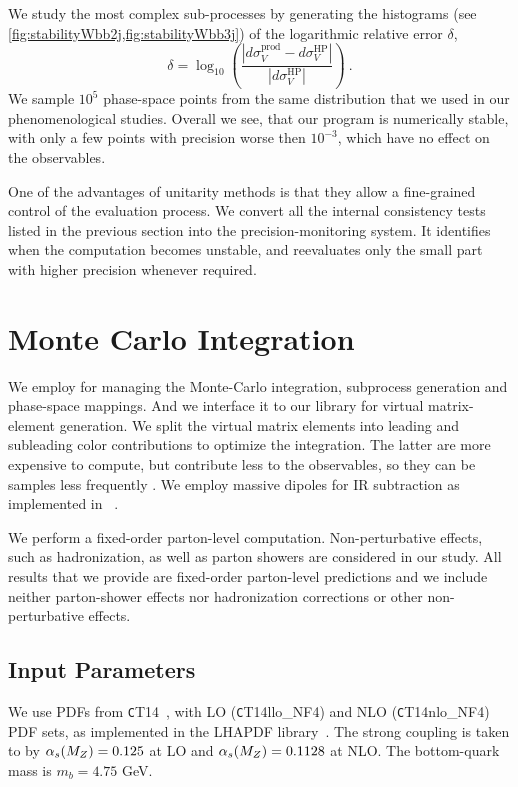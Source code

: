 We study the most complex sub-processes
by generating the histograms (see \cref{fig:stabilityWbb2j,fig:stabilityWbb3j}) of the logarithmic relative error $\delta$,
\begin{equation}
  \delta = \log_{10}\left(\frac{\left|d\sigma^{\text{prod}}_V - d\sigma^{\text{HP}}_V\right|}{\left|d\sigma^{\text{HP}}_V\right|}\right)\ .
  \label{reldiff}
\end{equation}
We sample $10^5$ phase-space points from the same distribution that we used in our phenomenological studies.
Overall we see, that our program is numerically stable,
with only a few points with precision worse then $10^{-3}$,
which have no effect on the observables.

One of the advantages of unitarity methods is that they allow a fine-grained control of the evaluation process.
We convert all the internal consistency tests listed in the previous section into
the precision-monitoring system.  
It identifies when the computation becomes unstable, and reevaluates
only the small part with higher precision whenever required.



\section{Monte Carlo Integration}
\label{sec:wbb:mc_integration}



We employ \SHERPA{}\cite{Sherpa} for managing the Monte-Carlo integration,
subprocess generation and phase-space mappings.
And we interface it to our library for virtual matrix-element generation.
We split the virtual matrix elements into leading and subleading color contributions
to optimize the integration. The latter are more expensive to compute, but contribute less to the observables,
so they can be samples less frequently \cite{BH:W3jDistributions,Ita:2011ar}.
We employ massive dipoles \cite{Catani2002} for IR subtraction as implemented in \COMIX{}~\cite{Comix}.
%

We perform a fixed-order parton-level computation. Non-perturbative effects, such as hadronization, as well as parton showers are considered in our study.
All results that we provide are fixed-order parton-level predictions and we include neither parton-shower effects nor hadronization corrections or other
non-perturbative effects.

\subsection{Input Parameters}
\label{sec:base_setup}
We use PDFs from {\texttt CT14}~\cite{CT14},
with LO ({\texttt CT14llo\_NF4}) and NLO ({\texttt CT14nlo\_NF4}) PDF sets, as
implemented in the LHAPDF library~\cite{LHAPDF}. 
The strong coupling is taken to by $\alpha_s(M_Z)=0.125$ at LO and
$\alpha_s(M_Z)=0.1128$ at NLO. 
The bottom-quark mass is $m_b=4.75$ GeV.

